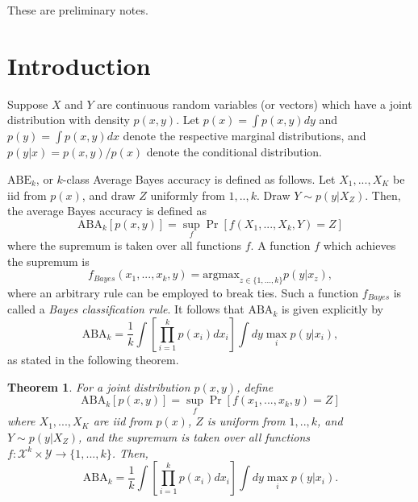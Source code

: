 \documentclass[12pt]{article}
\begin{document}
\maketitle

\newcommand{\tr}{\text{tr}}
\newcommand{\E}{\textbf{E}}
\newcommand{\diag}{\text{diag}}
\newcommand{\argmax}{\text{argmax}}
\newcommand{\Cov}{\text{Cov}}
\newcommand{\Var}{\text{Var}}
\newcommand{\argmin}{\text{argmin}}
\newcommand{\Vol}{\text{Vol}}
\newcommand{\comm}[1]{}
\newtheorem{theorem}{Theorem}[section]
\newtheorem{proposition}{Proposition}[section]
\newtheorem{corollary}{Corollary}[theorem]
\newtheorem{lemma}[theorem]{Lemma}

These are preliminary notes.

\section{Introduction}

Suppose $X$ and $Y$ are continuous random variables (or vectors) which have a joint distribution with density $p(x, y)$.
Let $p(x) = \int p(x,y) dy$ and $p(y) = \int p(x,y) dx$ denote the respective marginal distributions,
and $p(y|x) = p(x,y)/p(x)$ denote the conditional distribution.

$\text{ABE}_k$, or $k$-class Average Bayes accuracy is defined as follows.  Let $X_1,...,X_K$ be iid from $p(x)$,
and draw $Z$ uniformly from $1,..,k$.  Draw $Y \sim p(y|X_Z)$.
Then, the average Bayes accuracy is defined as
\[
\text{ABA}_k[p(x, y)] = \sup_f \Pr[f(X_1,...,X_k, Y) = Z] 
\]
where the supremum is taken over all functions $f$.  A function $f$ which achieves the supremum is
\[
f_{Bayes}(x_1,...,x_k, y) = \text{argmax}_{z \in \{1,...,k\}} p(y|x_z),
\]
where an arbitrary rule can be employed to break ties.
Such a function $f_{Bayes}$ is called a \emph{Bayes classification rule}.
It follows that $\text{ABA}_k$ is given explicitly by
\[
\text{ABA}_k = \frac{1}{k} \int \left[\prod_{i=1}^k p(x_i) dx_i \right] \int dy \max_i p(y|x_i),
\]
as stated in the following theorem.

\begin{theorem}
For a joint distribution $p(x, y)$, define
\[
\text{ABA}_k[p(x, y)] = \sup_f \Pr[f(x_1,...,x_k, y) = Z] 
\]
where $X_1,...,X_K$ are iid from $p(x)$, $Z$ is uniform from $1,..,k$, and $Y \sim p(y|X_Z)$,
and the supremum is taken over all functions $f: \mathcal{X}^k\times \mathcal{Y} \to \{1,...,k\}$.
Then,
\[
\text{ABA}_k = \frac{1}{k} \int \left[\prod_{i=1}^k p(x_i) dx_i \right] \int dy \max_i p(y|x_i).
\]
\end{theorem}
\end{document}
